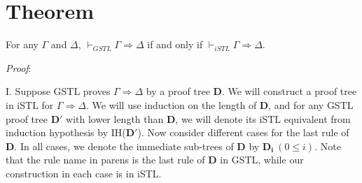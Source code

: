 \section{Theorem} \label{translation} For any $\Gamma$ and $\Delta$, $\vdash_{GSTL} \Gamma \Rightarrow \Delta$ if and only if $\vdash_{iSTL} \Gamma \Rightarrow \Delta$.

\textit{Proof}:

I. Suppose $\text{GSTL}$ proves $\Gamma \Rightarrow \Delta$ by a proof tree $\mathbf{D}$. We will construct a proof tree in $\text{iSTL}$ for $\Gamma \Rightarrow \Delta$. We will use induction on the length of $\mathbf{D}$, and for any GSTL proof tree $\mathbf{D'}$ with lower length than $\mathbf{D}$, we will denote its iSTL equivalent from induction hypothesis by IH($\mathbf{D'}$). Now consider different cases for the last rule of $\mathbf{D}$. In all cases, we denote the immediate sub-trees of $\mathbf{D}$ by $\mathbf{D_i} ~(0 \leq i)$. Note that the rule name in parens is the last rule of $\mathbf{D}$ in GSTL, while our construction in each case is in iSTL.
